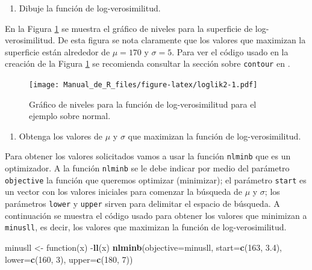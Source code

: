 \documentclass[10pt,]{krantz}
\makeatletter
\newenvironment{Shaded}{\begin{snugshade}}{\end{snugshade}}
\newcommand{\KeywordTok}[1]{\textcolor[rgb]{0.13,0.29,0.53}{\textbf{{#1}}}}
\newcommand{\DataTypeTok}[1]{\textcolor[rgb]{0.13,0.29,0.53}{{#1}}}
\newcommand{\DecValTok}[1]{\textcolor[rgb]{0.00,0.00,0.81}{{#1}}}
\newcommand{\FloatTok}[1]{\textcolor[rgb]{0.00,0.00,0.81}{{#1}}}
\newcommand{\StringTok}[1]{\textcolor[rgb]{0.31,0.60,0.02}{{#1}}}
\newcommand{\NormalTok}[1]{{#1}}
\providecommand{\tightlist}{%
  \setlength{\itemsep}{0pt}\setlength{\parskip}{0pt}}
\newenvironment{kframe}{%
\medskip{}
\setlength{\fboxsep}{.8em}
 \def\at@end@of@kframe{}%
 \ifinner\ifhmode%
  \def\at@end@of@kframe{\end{minipage}}%
  \begin{minipage}{\columnwidth}%
 \fi\fi%
 \def\FrameCommand##1{\hskip\@totalleftmargin \hskip-\fboxsep
 \colorbox{shadecolor}{##1}\hskip-\fboxsep
     \hskip-\linewidth \hskip-\@totalleftmargin \hskip\columnwidth}%
 \MakeFramed {\advance\hsize-\width
   \@totalleftmargin\z@ \linewidth\hsize
   \@setminipage}}%
 {\par\unskip\endMakeFramed%
 \at@end@of@kframe}
\renewenvironment{Shaded}{\begin{kframe}}{\end{kframe}}
\makeatother
\begin{document}
\begin{enumerate}
\def\labelenumi{\arabic{enumi})}
\setcounter{enumi}{1}
\tightlist
\item
  Dibuje la función de log-verosimilitud.
\end{enumerate}

En la Figura \ref{fig:loglik2} se muestra el gráfico de niveles para la
superficie de log-verosimilitud. De esta figura se nota claramente que
los valores que maximizan la superficie están alrededor de \(\mu=170\) y
\(\sigma=5\). Para ver el código usado en la creación de la Figura
\ref{fig:loglik2} se recomienda consultar la sección sobre
\texttt{contour} en \citet{hernandez_correa}.

\begin{figure}[htbp]
\centering
\texttt{[image: Manual\_de\_R\_files/figure-latex/loglik2-1.pdf]}
\caption{\label{fig:loglik2}Gráfico de niveles para la función de
log-verosimilitud para el ejemplo sobre normal.}
\end{figure}

\begin{enumerate}
\def\labelenumi{\arabic{enumi})}
\setcounter{enumi}{2}
\tightlist
\item
  Obtenga los valores de \(\mu\) y \(\sigma\) que maximizan la función
  de log-verosimilitud.
\end{enumerate}

Para obtener los valores solicitados vamos a usar la función
\texttt{nlminb} que es un optimizador. A la función \texttt{nlminb} se
le debe indicar por medio del parámetro \texttt{objective} la función
que queremos optimizar (minimizar); el parámetro \texttt{start} es un
vector con los valores iniciales para comenzar la búsqueda de \(\mu\) y
\(\sigma\); los parámetros \texttt{lower} y \texttt{upper} sirven para
delimitar el espacio de búsqueda. A continuación se muestra el código
usado para obtener los valores que minimizan a \texttt{minusll}, es
decir, los valores que maximizan la función de log-verosimilitud.

\begin{Shaded}
\begin{Highlighting}[]
\NormalTok{minusll <-}\StringTok{ }\NormalTok{function(x) -}\KeywordTok{ll}\NormalTok{(x)}
\KeywordTok{nlminb}\NormalTok{(}\DataTypeTok{objective=}\NormalTok{minusll, }\DataTypeTok{start=}\KeywordTok{c}\NormalTok{(}\DecValTok{163}\NormalTok{, }\FloatTok{3.4}\NormalTok{),}
       \DataTypeTok{lower=}\KeywordTok{c}\NormalTok{(}\DecValTok{160}\NormalTok{, }\DecValTok{3}\NormalTok{), }\DataTypeTok{upper=}\KeywordTok{c}\NormalTok{(}\DecValTok{180}\NormalTok{, }\DecValTok{7}\NormalTok{))}
\end{Highlighting}
\end{Shaded}
\end{document}
